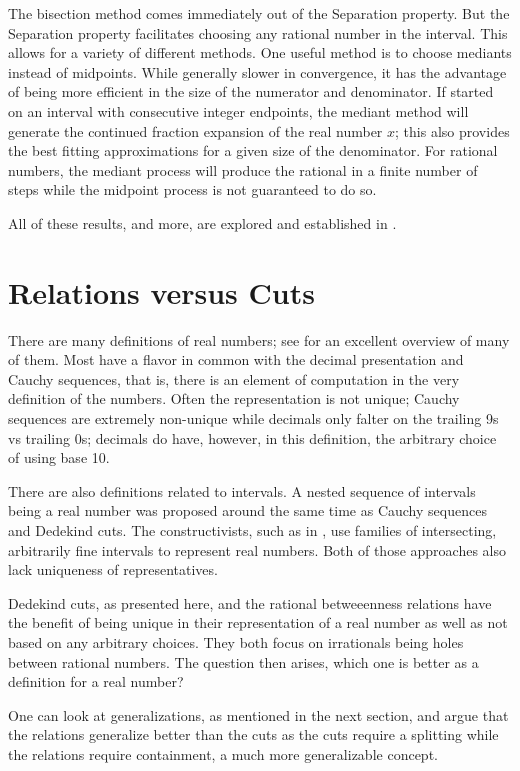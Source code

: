 \documentclass{rmj-public}
\begin{document}
The bisection method comes immediately out of the Separation property. But the Separation property facilitates choosing any rational number in the interval. This allows for a variety of different methods. One useful method is to choose mediants instead of midpoints. While generally slower in convergence, it has the advantage of being more efficient in the size of the numerator and denominator. If started on an interval with consecutive integer endpoints, the mediant method will generate the continued fraction expansion of the real number $x$; this also provides the best fitting approximations for a given size of the denominator. For rational numbers, the mediant process will produce the rational in a finite number of steps while the midpoint process is not guaranteed to do so. 

All of these results, and more, are explored and established in \cite{taylor23main}.

\section{Relations versus Cuts}

There are many definitions of real numbers; see \cite{ittay-2015} for an excellent overview of many of them. Most have a flavor in common with the decimal presentation and Cauchy sequences, that is, there is an element of computation in the very definition of the numbers. Often the representation is not unique; Cauchy sequences are extremely non-unique while decimals only falter on the trailing 9s vs trailing 0s; decimals do have, however, in this definition, the arbitrary choice of using base 10. 

There are also definitions related to intervals. A nested sequence of intervals being a real number was proposed around the same time as Cauchy sequences and Dedekind cuts. The constructivists, such as in \cite{bridger}, use families of intersecting, arbitrarily fine intervals to represent real numbers. Both of those approaches also lack uniqueness of representatives. 

Dedekind cuts, as presented here, and the rational betweeenness relations have the benefit of being unique in their representation of a real number as well as not based on any arbitrary choices. They both focus on irrationals being holes between rational numbers. The question then arises, which one is better as a definition for a real number? 

One can look at generalizations, as mentioned in the next section, and argue that the relations generalize better than the cuts as the cuts require a splitting while the relations require containment, a much more generalizable concept. 
\end{document}
